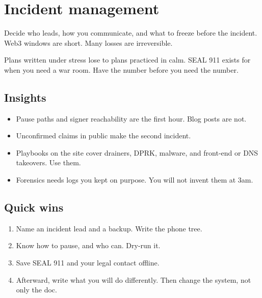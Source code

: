 \chapter{Incident management}

Decide who leads, how you communicate, and what to
freeze before the incident. Web3 windows are short.
Many losses are irreversible.

Plans written under stress lose to plans practiced in
calm. SEAL 911 exists for when you need a war room.
Have the number before you need the number.

\section{Insights}

\begin{itemize}
  \item Pause paths and signer reachability are the
  first hour. Blog posts are not.
  \item Unconfirmed claims in public make the second
  incident.
  \item Playbooks on the site cover drainers, DPRK,
  malware, and front-end or DNS takeovers. Use them.
  \item Forensics needs logs you kept on purpose. You
  will not invent them at 3am.
\end{itemize}

\section{Quick wins}

\begin{enumerate}
  \item Name an incident lead and a backup. Write the
  phone tree.
  \item Know how to pause, and who can. Dry-run it.
  \item Save SEAL 911 and your legal contact offline.
  \item Afterward, write what you will do differently.
  Then change the system, not only the doc.
\end{enumerate}
